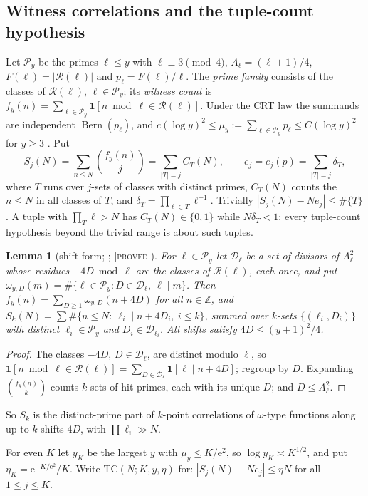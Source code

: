 \documentclass[10pt,reqno]{amsart}
\newtheorem{lemma}[theorem]{Lemma}
\theoremstyle{definition}
\theoremstyle{remark}
\newcommand{\cP}{\mathcal P}
\newcommand{\cR}{\mathscr R}
\newcommand{\Z}{\mathbb Z}
\newcommand{\ind}{\mathbf 1}
\newcommand{\Bern}{\operatorname{Bern}}
\newcommand{\e}{\mathrm e}
\newcommand{\lab}[1]{\textup{[\textsc{#1}]}}
\begin{document}
\subsection{Witness correlations and the tuple-count hypothesis}
Let $\cP_y$ be the primes $\ell\leq y$ with $\ell\equiv3\pmod4$, $A_\ell=(\ell+1)/4$,
$F(\ell)=|\cR(\ell)|$ and $p_\ell=F(\ell)/\ell$.  The \emph{prime family} consists
of the classes of $\cR(\ell)$, $\ell\in\cP_y$; its \emph{witness count} is
$f_y(n)=\sum_{\ell\in\cP_y}\ind[n\bmod\ell\in\cR(\ell)]$.  Under the CRT law the
summands are independent $\Bern(p_\ell)$, and
$c(\log y)^2\leq\mu_y:=\sum_{\ell\in\cP_y}p_\ell\leq C(\log y)^2$ for $y\geq3$
\cite[(1.3)]{TU}.  Put
\[
 S_j(N)=\sum_{n\leq N}\binom{f_y(n)}j=\sum_{|T|=j}C_T(N),\qquad e_j=e_j(p)=\sum_{|T|=j}\delta_T,
\]
where $T$ runs over $j$-sets of classes with distinct primes, $C_T(N)$
counts the $n\leq N$ in all classes of $T$, and $\delta_T=\prod_{\ell\in T}\ell^{-1}$.
Trivially $|S_j(N)-Ne_j|\leq\#\{T\}$ \cite[Lemma~1.2]{TU}.  A tuple with
$\prod_T\ell>N$ has $C_T(N)\in\{0,1\}$ while $N\delta_T<1$; every tuple-count
hypothesis beyond the trivial range is about such tuples.

\begin{lemma}[shift form; {\cite[Lemma~1.3]{TU}}; \lab{proved}]\label{lem:shiftform}
For $\ell\in\cP_y$ let $\mathcal D_\ell$ be a set of divisors of $A_\ell^2$ whose
residues $-4D\bmod\ell$ are the classes of $\cR(\ell)$, each once, and put
$\omega_{y,D}(m)=\#\{\ell\in\cP_y:D\in\mathcal D_\ell,\ \ell\mid m\}$.  Then
$f_y(n)=\sum_{D\geq1}\omega_{y,D}(n+4D)$ for all $n\in\Z$, and
$S_k(N)=\sum\#\{n\leq N:\ \ell_i\mid n+4D_i,\ i\leq k\}$, summed over $k$-sets
$\{(\ell_i,D_i)\}$ with distinct $\ell_i\in\cP_y$ and $D_i\in\mathcal D_{\ell_i}$.  All
shifts satisfy $4D\leq(y+1)^2/4$.
\end{lemma}
\begin{proof}
The classes $-4D$, $D\in\mathcal D_\ell$, are distinct modulo $\ell$, so
$\ind[n\bmod\ell\in\cR(\ell)]=\sum_{D\in\mathcal D_\ell}\ind[\ell\mid n+4D]$; regroup by $D$.
Expanding $\binom{f_y(n)}k$ counts $k$-sets of hit primes, each with its
unique $D$; and $D\leq A_\ell^2$.
\end{proof}
So $S_k$ is the distinct-prime part of $k$-point correlations of
$\omega$-type functions along up to $k$ shifts $4D$, with $\prod\ell_i\gg N$.

For even $K$ let $y_K$ be the largest $y$ with $\mu_y\leq K/\e^2$, so
$\log y_K\asymp K^{1/2}$, and put $\eta_K=\e^{-K/\e^2}/K$.  Write $\mathrm{TC}(N;K,y,\eta)$
for: $|S_j(N)-Ne_j|\leq\eta N$ for all $1\leq j\leq K$.
\end{document}
